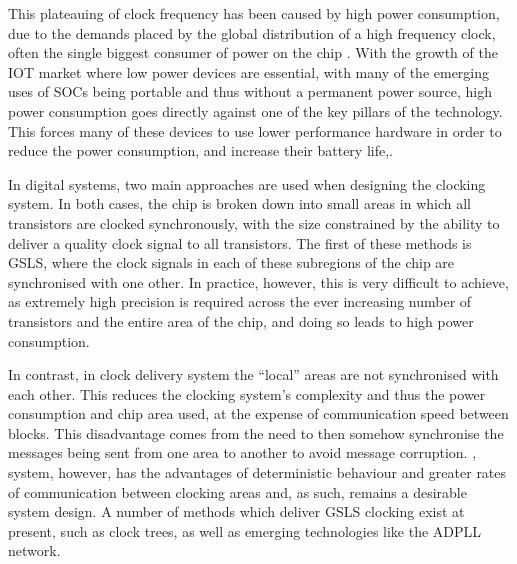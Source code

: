 This plateauing of clock frequency has been caused by high power consumption, due to the demands placed by the global distribution of a high frequency clock, often the single biggest consumer of power on the chip \cite{tiwari1998reducing}.
With the growth of the \ac{IOT} market where low power devices are essential, with many of the emerging uses of \acp{SOC} being portable and thus without a permanent power source, high power consumption goes directly against one of the key pillars of the technology. This forces many of these devices to use lower performance hardware in order to reduce the power consumption, and increase their battery life,.

In digital systems, two main approaches are used when designing the clocking system. In both cases, the chip is broken down into small areas in which all transistors are clocked synchronously, with the size constrained by the ability to deliver a quality clock signal to all transistors. The first of these methods is \ac{GSLS}, where the clock signals in each of these subregions of the chip are synchronised with one other. In practice, however, this is very difficult to achieve, as extremely high precision is required across the ever increasing number of transistors and the entire area of the chip, and doing so leads to high power consumption.

In contrast, in  clock delivery system the ``local'' areas are not synchronised with each other. This reduces the clocking system's complexity and thus the power consumption and chip area used, at the expense of communication speed between blocks. This disadvantage comes from the need to then somehow synchronise the messages being sent from one area to another to avoid message corruption.
, system, however, has the advantages of deterministic behaviour and greater rates of communication between clocking areas and, as such, remains a desirable system design. A number of methods which deliver \ac{GSLS} clocking exist at present, such as clock trees, as well as emerging technologies like the ADPLL network.

